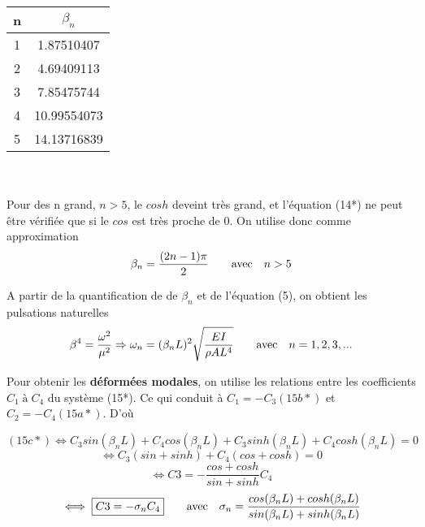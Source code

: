 \documentclass[a4paper,10pt]{article}
\begin{document}
\begin{tabular}{|c|c|}
\hline
n & \begin{math} \beta_n \end{math} \\ \hline
1 & 1.87510407 \\ \hline
2 & 4.69409113 \\ \hline
3 & 7.85475744	\\ \hline
4 & 10.99554073	\\ \hline
5 & 14.13716839	\\ \hline
\end{tabular}
\\\\
Pour des n grand, \begin{math} n>5 \end{math}, le \begin{math} cosh \end{math} deveint très grand, et l'équation (14*) ne peut être vérifiée que si le \begin{math} cos \end{math} est très proche de 0. On utilise donc comme approximation \begin{equation} \beta_n = \frac{(2n-1)\pi}{2} \text{\qquad avec\quad} n>5\end{equation}

A partir de la quantification de de \begin{math} \beta_n \end{math} et de l'équation (5), on obtient les pulsations naturelles
\begin{equation}  \beta^4 = \frac{\omega^2}{\mu^2}\Rightarrow  \omega_n = (\beta_n L)^2 \sqrt{  \frac{EI}{\rho A L^4}}  \text{\qquad avec\quad} n=1,2,3,... \end{equation}

Pour obtenir les \textbf{déformées modales}, on utilise les relations entre les coefficients \begin{math} C_1 \; à \;  C_4 \end{math} du système (15*).
Ce qui conduit à \begin{math} C_1=-C_3 (15b*) \end{math} et \begin{math}  C_2 = -C_4 (15a*)\end{math}.
D'où

\begin{equation}(15c*) \iff C_3 sin(\beta_n L)  + C_4 cos(\beta_n L)  +  C_3 sinh(\beta_n L)  + C_4 cosh(\beta_n L)  =  0  \end{equation}
\begin{equation} \iff C_3 (sin + sinh) + C_4 (cos + cosh) = 0  \end{equation}
\begin{equation} \iff C3 = - \frac{cos + cosh}{sin + sinh}C_4 \end{equation}
\begin{equation} \iff \boxed{C3 = - \sigma_n C_4} \text{\qquad avec\quad} \sigma_n= \frac{cos(\beta_n L) + cosh(\beta_n L)}{sin(\beta_n L) + sinh(\beta_n L)}\end{equation}
\end{document}
